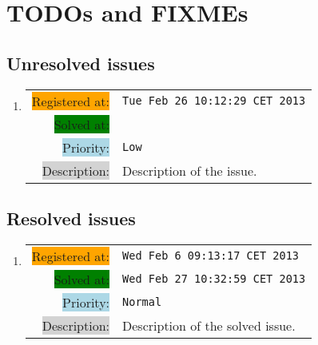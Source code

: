 

\newcommand{\PriorityLow}		{Low}
\newcommand{\PriorityNormal}	{Normal}
\newcommand{\PriorityHigh}		{High}

\newcommand{\issue}[4] {
						
						\begin{tabularx}{1\textwidth}{
											|r@{ }
											>{\setlength\hsize{1\hsize}
												\raggedright\arraybackslash}X| }
						\hline
						\colorbox{orange}{Registered at:}	& \texttt{#1}	\\

						\colorbox{green}{Solved at:}		& \texttt{#2}	\\
						
						\colorbox{lightblue}{Priority: }	& \texttt{#3}	\\

						\colorbox{lightgray}{Description:}	& #4			\\
						\hline
						\end{tabularx}
						}


\section{TODOs and FIXMEs}

\subsection{Unresolved issues}

	\begin{enumerate}

	\item	\issue{Tue Feb 26 10:12:29 CET 2013}
					{}
					{\PriorityLow}
		{
			Description of the issue.
		}

	\end{enumerate}

	
\subsection{Resolved issues}

	\begin{enumerate}

	\item	\issue{Wed Feb  6 09:13:17 CET 2013}
					{Wed Feb 27 10:32:59 CET 2013}
					{\PriorityNormal}
		{
			Description of the solved issue.
		}

	\end{enumerate}
	
